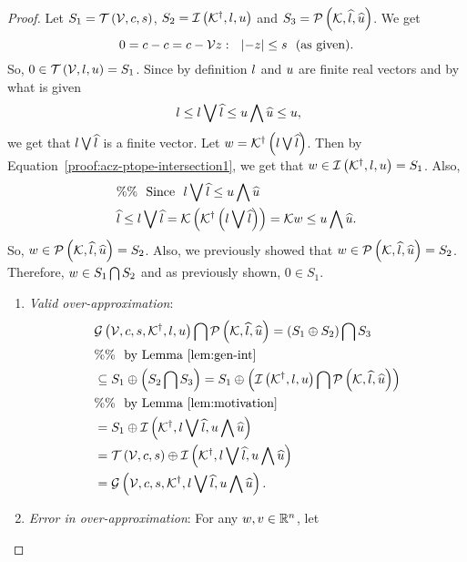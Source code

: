 %
\begin{proof}
Let $S_1=\mathit{\operatorname{\mathcal{T}}}\left(\mathcal{V},c,s\right)$,
$S_2=\mathit{\operatorname{\mathcal{I}}}\left({\mathcal{K}}^\dagger,l,u\right)$ and
$S_3=\mathcal{P}\left(\mathcal{K},\widehat{l},\widehat{u}\right)$.  We get
%
\[
0=c-c=c-\mathcal{V} z:~~\left|-z\right|\leq s~~\text{(as given)}.
\]
%
So, $0\in \mathit{\operatorname{\mathcal{T}}}\left(\mathcal{V},l,u\right)=S_1$.  Since by definition $l$ and $u$ are finite real
vectors and by what is given
%
\begin{equation}~\label{proof:acz-ptope-intersection1}
  l\leq l\bigvee \widehat{l}\leq u\bigwedge \widehat{u}\leq u,
\end{equation}
%
 we get that $l\bigvee \widehat{l}$ is a finite vector.  Let
 $w={\mathcal{K}}^\dagger\left(l\bigvee \widehat{l}\right)$.  Then by Equation~\ref{proof:acz-ptope-intersection1},
 we get that $w\in\mathit{\operatorname{\mathcal{I}}}\left({\mathcal{K}}^\dagger,l,u\right)=S_1$.  Also,
%
 \begin{align*}
   &\%\%~~\text{Since}~~l\bigvee \widehat{l}\leq u\bigwedge \widehat{u}\\
& \widehat{l}\leq l\bigvee \widehat{l}=\mathcal{K}\left({\mathcal{K}}^\dagger\left(l\bigvee \widehat{l}\right)\right)=\mathcal{K}
w
\leq u\bigwedge \widehat{u}.
\end{align*}
%
So, $w\in\mathcal{P}\left(\mathcal{K},\widehat{l},\widehat{u}\right)=S_2$.  Also, we previously showed
that $w\in\mathcal{P}\left(\mathcal{K},\widehat{l},\widehat{u}\right)=S_2$.  Therefore, $w\in
S_1\bigcap S_2$ and as previously shown, $0\in S_1$.
\begin{enumerate}
\item {\it Valid over-approximation}:
%
\begin{align*}
  & \mathcal{G}\left(\mathcal{V},c,s,{\mathcal{K}}^\dagger,l,u\right)\bigcap \mathcal{P}\left(\mathcal{K},\widehat{l},\widehat{u}\right)=
  \left(S_1\oplus S_2\right)\bigcap S_3\\
  &\%\%~~ \text{by Lemma~\ref{lem:gen-int}}\\
  & \subseteq S_1\oplus \left(S_2\bigcap S_3\right)=
  S_1\oplus \left(\mathit{\operatorname{\mathcal{I}}}\left({\mathcal{K}}^\dagger,l,u\right)\bigcap \mathcal{P}\left(\mathcal{K},\widehat{l},\widehat{u}\right)\right)\\
  & \%\%~~\text{by Lemma~\ref{lem:motivation}}\\
  &
  = S_1\oplus \mathit{\operatorname{\mathcal{I}}}\left({\mathcal{K}}^\dagger,l\bigvee \widehat{l},u\bigwedge \widehat{u}\right)\\
  & =
  \mathit{\operatorname{\mathcal{T}}}\left(\mathcal{V},c,s\right)\oplus \mathit{\operatorname{\mathcal{I}}}\left({\mathcal{K}}^\dagger,l\bigvee \widehat{l},u\bigwedge \widehat{u}\right)\\
  & = \mathcal{G}\left(\mathcal{V},c,s,{\mathcal{K}}^\dagger,l\bigvee \widehat{l},u\bigwedge \widehat{u}\right).
\end{align*}
\item {\it Error in over-approximation}: For any $w,v\in\mathbb{R}^n$, let

\end{enumerate}
\end{proof}
